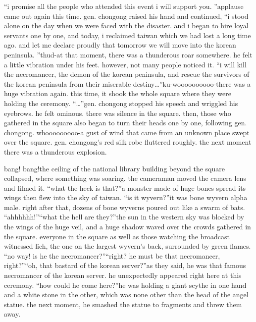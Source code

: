 “i promise all the people who attended this event i will support you.
”applause came out again this time.
gen.
 chongong raised his hand and continued, “i stood alone on the day when we were faced with the disaster.
 and i began to hire loyal servants one by one, and today, i reclaimed taiwan which we had lost a long time ago.
 and let me declare proudly that tomorrow we will move into the korean peninsula.
”thud-at that moment, there was a thunderous roar somewhere.
 he felt a little vibration under his feet.
 however, not many people noticed it.
“i will kill the necromancer, the demon of the korean peninsula, and rescue the survivors of the korean peninsula from their miserable destiny…”ku-woooooooooo-there was a huge vibration again.
 this time, it shook the whole square where they were holding the ceremony.
“…”gen.
 chongong stopped his speech and wriggled his eyebrows.
 he felt ominous.
 there was silence in the square.
then, those who gathered in the square also began to turn their heads one by one, following gen.
 chongong.
whooooooooo-a gust of wind that came from an unknown place swept over the square.
 gen.
 chongong’s red silk robe fluttered roughly.
 the next moment there was a thunderous explosion.


bang! bang!the ceiling of the national library building beyond the square collapsed, where something was soaring.
 the cameraman moved the camera lens and filmed it.
“what the heck is that?”a monster made of huge bones spread its wings then flew into the sky of taiwan.
“is it wyvern?”it was bone wyvern alpha male.
right after that, dozens of bone wyverns poured out like a swarm of bats.
“ahhhhhh!”“what the hell are they?”the sun in the western sky was blocked by the wings of the huge veil, and a huge shadow waved over the crowds gathered in the square.
everyone in the square as well as those watching the broadcast witnessed lich, the one on the largest wyvern’s back, surrounded by green flames.
“no way! is he the necromancer?”“right? he must be that necromancer, right?”“oh, that bastard of the korean server?”as they said, he was that famous necromancer of the korean server.
he unexpectedly appeared right here at this ceremony.
“how could he come here?”he was holding a giant scythe in one hand and a white stone in the other, which was none other than the head of the angel statue.
the next moment, he smashed the statue to fragments and threw them away.


 